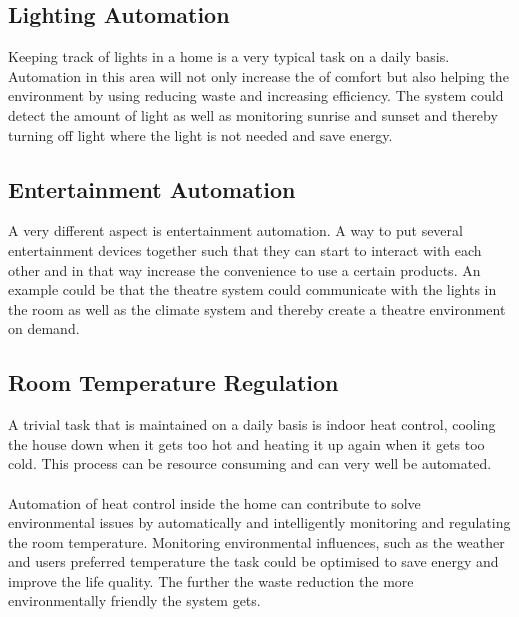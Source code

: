 \subsection{Lighting Automation}
\label{sub:Lighting Automation}
Keeping track of lights in a home is a very typical task on a daily basis. Automation in this area will not only increase the of comfort but also helping the environment by using reducing waste and increasing efficiency.  The system could detect the amount of light as well as monitoring sunrise and sunset and thereby turning off light where the light is not needed and save energy.

\subsection{Entertainment Automation}
\label{sub:Entertainment Automation}
A very different aspect is entertainment automation. A way to put several entertainment devices together such that they can start to interact with each other and in that way increase the convenience to use a certain products. An example could be that the theatre system could communicate with the lights in the room as well as the climate system and thereby create a theatre environment on demand.

\subsection{Room Temperature Regulation}
\label{sub:Room Temperature Regulation}
A trivial task that is maintained on a daily basis is indoor heat control, cooling the house down when it gets too hot and heating it up again when it gets too cold. This process can be resource consuming and can very well be automated.
\\\\
Automation of heat control inside the home can contribute to solve environmental issues by automatically and intelligently monitoring and regulating the room temperature. Monitoring environmental influences, such as the weather and users preferred temperature the task could be optimised to save energy and improve the life quality.  The further the waste reduction the more environmentally friendly the system gets.
